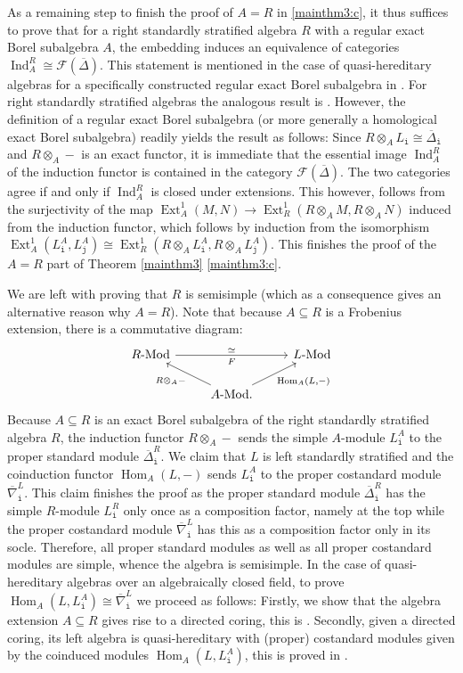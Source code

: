 \documentclass[12pt,a4paper]{amsart}
\theoremstyle{plain}
\theoremstyle{definition}
\numberwithin{equation}{thm}
\DeclareMathOperator{\Hom}{Hom}
\DeclareMathOperator{\Ext}{Ext}
\DeclareMathOperator{\Ind}{Ind}
\newcommand{\Mod}[1]{#1\hbox{-}\mathrm{Mod}}
\begin{document}
As a remaining step to finish the proof of $A=R$ in \eqref{mainthm3:c}, it thus suffices to prove that for a right standardly stratified algebra $R$ with a regular exact Borel subalgebra $A$, the embedding induces an equivalence of categories $\Ind_A^R\cong \mathcal{F}(\overline{\Delta})$. This statement is mentioned in the case of quasi-hereditary algebras for a specifically constructed regular exact Borel subalgebra in \cite[Theorems 10.4 and 11.3]{KKO14}. For right standardly stratified algebras the analogous result is \cite[Theorem 6.15]{Got24}. However, the definition of a regular exact Borel subalgebra (or more generally a homological exact Borel subalgebra) readily yields the result as follows: Since $R\otimes_A L_\mathtt{i}\cong \overline{\Delta}_\mathtt{i}$ and $R\otimes_A -$ is an exact functor, it is immediate that the essential image $\Ind_A^R$ of the induction functor is contained in the category $\mathcal{F}(\overline{\Delta})$. The two categories agree if and only if $\Ind_A^R$ is closed under extensions. This however, follows from the surjectivity of the map $\Ext^1_A(M,N)\to \Ext^1_R(R\otimes_A M,R\otimes_A N)$ induced from the induction functor, which follows by induction from the isomorphism $\Ext^1_A(L_\mathtt{i}^A,L_\mathtt{j}^A)\cong \Ext^1_R(R\otimes_A L_\mathtt{i}^A, R\otimes_A L_\mathtt{j}^A)$. This finishes the proof of the $A=R$ part of  Theorem \ref{mainthm3} \eqref{mainthm3:c}.

We are left with proving that $R$ is semisimple (which as a consequence gives an alternative reason why $A=R$). Note that because $A\subseteq R$ is a Frobenius extension, there is a commutative diagram:
\[\begin{tikzcd}
  \Mod{R} \ar{rr}{\simeq}[swap]{F} && \Mod{L}  \\
  &  \arrow{ul}{R \otimes_A -} \Mod{A}. \arrow{ur}[swap]{\Hom_A(L,-)} & 
\end{tikzcd}\]
Because $A\subseteq R$ is an exact Borel subalgebra of the right standardly stratified algebra $R$, the induction functor $R\otimes_A-$ sends the simple $A$-module $L_\mathtt{i}^A$ to the proper standard module $\overline{\Delta}_\mathtt{i}^R$. We claim that $L$ is left standardly stratified and the coinduction functor $\Hom_A(L,-)$ sends $L_\mathtt{i}^A$ to the proper costandard module $\overline{\nabla}_\mathtt{i}^L$. This claim finishes the proof as the proper standard module $\overline{\Delta}_\mathtt{i}^R$ has the simple $R$-module $L_\mathtt{i}^R$ only once as a composition factor, namely at the top while the proper costandard module $\overline{\nabla}_\mathtt{i}^L$ has this as a composition factor only in its socle. Therefore, all proper standard modules as well as all proper costandard modules are simple, whence the algebra is semisimple. In the case of quasi-hereditary algebras over an algebraically closed field, to prove $\Hom_A(L,L_\mathtt{i}^A)\cong \overline{\nabla}_\mathtt{i}^L$ we proceed as follows: Firstly, we show that the algebra extension $A\subseteq R$ gives rise to a directed coring, this is \cite[Theorem 3.13]{BKK20}. Secondly, given a  directed coring, its left algebra is quasi-hereditary with (proper) costandard modules given by the coinduced modules $\Hom_A(L,L_\mathtt{i}^A)$, this is proved in \cite[Theorem 11.2]{KKO14}. 
\end{document}
